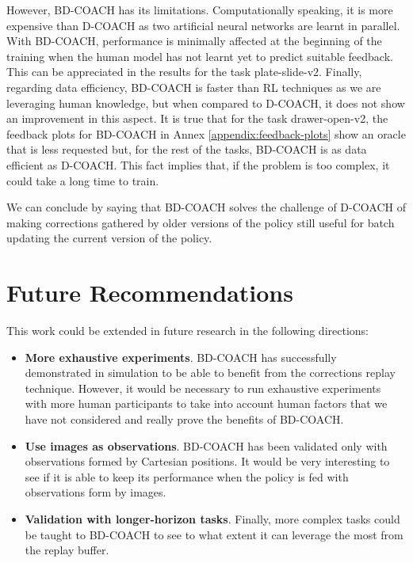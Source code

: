 However, BD-COACH has its limitations. Computationally speaking, it is more expensive than D-COACH as two artificial neural networks are learnt in parallel. With BD-COACH, performance is minimally affected at the beginning of the training when the human model has not learnt yet to predict suitable feedback. This can be appreciated in the results for the task plate-slide-v2. Finally, regarding data efficiency, BD-COACH is faster than RL techniques as we are leveraging human knowledge, but when compared to D-COACH, it does not show an improvement in this aspect. It is true that for the task drawer-open-v2, the feedback plots for BD-COACH in Annex \ref{appendix:feedback-plots} show an oracle that is less requested but, for the rest of the tasks, BD-COACH is as data efficient as D-COACH. This fact implies that, if the problem is too complex, it could take a long time to train.


We can conclude by saying that BD-COACH solves the challenge of D-COACH of making corrections gathered by older versions of the policy still useful for batch updating the current version of the policy.

 \vspace{2cm}

\section*{Future Recommendations}

This work could be extended in future research in the following directions:

\begin{itemize}
  \item \textbf{More exhaustive experiments}. BD-COACH has successfully demonstrated in simulation to be able to benefit from the corrections replay technique. However, it would be necessary to run exhaustive experiments with more human participants to take into account human factors that we have not considered and really prove the benefits of BD-COACH.
  
  
  \vspace{0.5cm}
  \item \textbf{Use images as observations}. BD-COACH has been validated only with observations formed by Cartesian positions. It would be very interesting to see if it is able to keep its performance when the policy is fed with observations form by images.
  \vspace{0.5cm}
  \item \textbf{Validation with longer-horizon tasks}. Finally, more complex tasks could be taught to BD-COACH to see to what extent it can leverage the most from the replay buffer.
\end{itemize}

